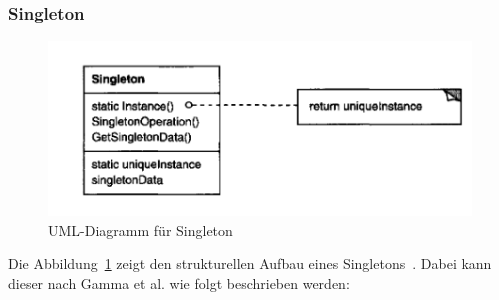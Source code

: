 \subsubsection{Singleton}

\begin{figure}[h]
    \centering
    \includegraphics{figures/singleton.png}
    \caption{UML-Diagramm für Singleton}
    \label{fig:singleton}
\end{figure}

Die Abbildung~\ref{fig:singleton} zeigt den strukturellen Aufbau eines Singletons~\cite[S. 127]{gamma1994design}.
Dabei kann dieser nach Gamma et al. wie folgt beschrieben werden:

